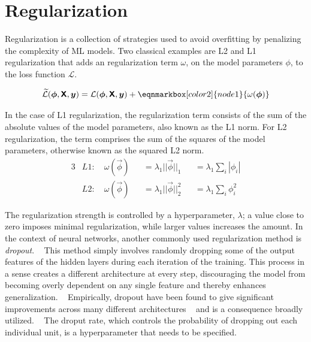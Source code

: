\section{Regularization}
\label{sec:regularization}

Regularization is a collection of strategies used to avoid
overfitting by penalizing the complexity of \ac{ML} models.
Two classical examples are L2 and L1 regularization
that adds an regularization term \(\omega\),
on the model parameters \(\phi\),
to the loss function \(\mathcal{L}\).
~\autocite{goodfellow2016deep}

\vspace{1.5em}
\begin{equation}
    \widetilde{\mathcal{L}} (\vec{\phi} , \mat{X}, \vec{y}) =
    \mathcal{L} (\vec{\phi} , \mat{X}, \vec{y}) +
    \eqnmarkbox[color2]{node1}{ \omega (\vec{\phi})}
\end{equation}

In the case of L1 regularization, 
the regularization term consists of 
the sum of the absolute values of the model parameters, 
also known as the L1 norm. 
For L2 regularization, 
the term comprises the sum of the squares of the model parameters, 
otherwise known as the squared L2 norm.
~\autocite{murphyMachine2012}
%
\begin{alignat}{3}
    &L1: \quad \omega (\vec{\phi}) 
        &&= \lambda_{1}||\vec{\phi}||_1 
        &&= \lambda_{1}\sum_{i}|\phi_i|  \\
    &L2: \quad \omega (\vec{\phi}) 
        &&= \lambda_{1}||\vec{\phi}||_2^2 
        &&= \lambda_{1}\sum_{i} \phi_i^2
\end{alignat}

The regularization strength is controlled by a hyperparameter, \(\lambda\);
a value close to zero imposes minimal regularization, 
while larger values increases the amount.
In the context of neural networks, 
another commonly used regularization method is \textit{dropout}.
~\autocite{srivastava2014dropout}
This method simply involves randomly dropping some of the output features
of the hidden layers during each iteration of the training.
This process in a sense creates a different architecture at every step,
discouraging the model from becoming overly dependent on any single feature 
and thereby enhances generalization. 
~\autocite{charniakIntroduction2019}
Empirically, dropout have been found to give significant improvements across
many different architectures 
~\autocite{srivastava2014dropout}
and is a consequence broadly utilized.
~\autocite{charniakIntroduction2019}
The droput rate, which controls the probability of dropping out each
individual unit, is a hyperparameter that needs to be specified.

